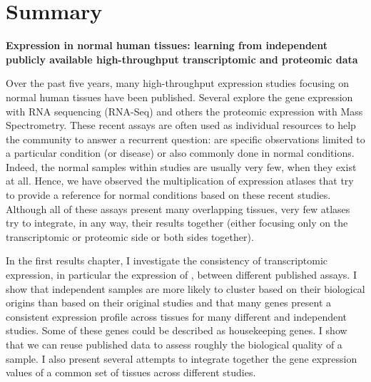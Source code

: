 \clearpage
\chapter*{Summary}
\label{ch:summary}

\begin{singlespace}

%

    \textbf{Expression in normal human tissues: learning from
    independent publicly available high-throughput transcriptomic and proteomic
    data}

    \begin{small}
        Over the past five years, many high-throughput expression studies
        focusing on normal human tissues have been published. Several explore
        the gene expression with \gls{RNA} sequencing (\gls{RNA-Seq}) and others
        the proteomic expression with Mass Spectrometry. These recent assays are
        often used as individual resources to help the community to answer a
        recurrent question: are specific observations limited to a particular
        condition (or disease) or also commonly done in normal conditions.
        Indeed, the normal samples within studies are usually very few, when they
        exist at all. Hence, we have observed the multiplication of expression
        atlases that try to provide a reference for normal conditions based on
        these recent studies. Although all of these assays
        present many overlapping tissues, very few atlases try to integrate,
        in any way, their results together (either focusing only on the
        transcriptomic or proteomic side or both sides together).

        In the first results chapter, I investigate the consistency of
        transcriptomic expression, in particular the expression of \mRNAs,
        between different published assays. I show that independent samples are
        more likely to cluster based on their biological origins than based on
        their original studies and that many genes present a consistent expression
        profile across tissues for many different and independent studies. Some
        of these genes could be described as housekeeping genes. I show that we
        can reuse published data to assess roughly the biological quality of a
        sample. I also present several attempts to integrate together the gene
        expression values of a common set of tissues across different studies.


\end{small}
\end{singlespace}
